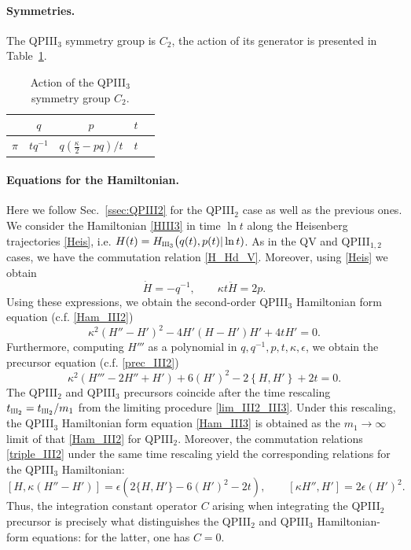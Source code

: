 \documentclass[12pt,a4paper]{article}
\numberwithin{equation}{section}
\newcommand{\III}{\scalebox{.6}{III}}
\begin{document}
\paragraph{Symmetries.} The QPIII$_3$ symmetry group is $C_2$, the action of its generator is presented in Table~\ref{table:QPIII3_Backlund}.
\begin{table}[H]
\begin{center}
\begin{tabular}{ |c|c|c|c|c| } 
\hline
 & $q$ & $p$ & $t$ \\
\hline
\hline
 $\pi$ & $tq^{-1}$ & $q\left(\frac{\kappa}2-pq\right)/t$ & $t$\\ 
 \hline
\end{tabular}
\caption{Action of the QPIII$_3$ symmetry group $C_2$.}
\label{table:QPIII3_Backlund}
\end{center}
\end{table}

\paragraph{Equations for the Hamiltonian.}

Here we follow Sec.~\ref{ssec:QPIII2} for the QPIII$_2$ case as well as the previous ones. We consider the Hamiltonian \eqref{HIII3} in time $\ln t$ along the Heisenberg trajectories \eqref{Heis}, i.e. $H(t)=H_{\III_3}\big(q(t),p(t)|\ln t)$. 
As in the QV and QPIII$_{1,2}$ cases, we have the commutation relation \eqref{H_Hd_V}. Moreover, using \eqref{Heis} we obtain
\begin{equation}\label{Hder_III3}
\dot{H}=-q^{-1},\qquad \kappa t\ddot{H}=2p.   
\end{equation}
Using these expressions, we obtain the second-order QPIII$_3$ Hamiltonian form equation (c.f. \eqref{Ham_III2})
\begin{equation}\label{Ham_III3}
\kappa^2(H''-H')^2-4H'(H-H')H'+4tH'=0.
\end{equation}
Furthermore, computing $H'''$ as a polynomial in $q,q^{-1},p,t,\kappa,\epsilon$, we obtain the precursor equation (c.f. \eqref{prec_III2})
\begin{equation}\label{prec_III3}
\kappa^2(H'''-2H''+H')+6(H')^2-2\left\{H,H'\right\}+2t=0. 
\end{equation} 
The QPIII$_2$ and QPIII$_3$ precursors coincide after the time rescaling $t_{\III_2}= t_{\III_2}/m_1$ from the limiting procedure \eqref{lim_III2_III3}. Under this rescaling, the QPIII$_3$ Hamiltonian form equation \eqref{Ham_III3} is obtained as the $m_1\rightarrow\infty$ limit of that \eqref{Ham_III2} for QPIII$_2$. 
Moreover, the commutation relations \eqref{triple_III2} under the same time rescaling yield the corresponding relations for the QPIII$_3$ Hamiltonian:
\begin{equation}\label{triple_III3}
[H,\kappa(H''{-}H')]=\epsilon\left(2\{H,H'\}-6(H')^2-2t\right), \qquad [\kappa H'',H']=2\epsilon(H')^2.
\end{equation}
Thus, the integration constant operator $C$ arising when integrating the QPIII$_2$ precursor is precisely what distinguishes the QPIII$_2$ and QPIII$_3$ Hamiltonian-form equations: for the latter, one has $C=0$.
\end{document}
